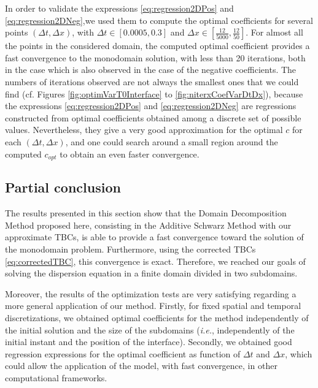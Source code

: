 \indent In order to validate the expressions \eqref{eq:regression2DPos} and \eqref{eq:regression2DNeg},we used them to compute the optimal coefficients for several points $(\Delta t, \Delta x)$, with $\Delta t \in [0.0005,0.3]$ and $\Delta x \in \left[ \frac{12}{5000},\frac{12}{50} \right]$. For almost all the points in the considered domain, the computed optimal coefficient provides a fast convergence to the monodomain solution, with less than 20 iterations, both in the case which is also observed in the case of the negative coefficients. The numbers of iterations observed are not always the smallest ones that we could find (cf. Figures \ref{fig:optimVarT0Interface} to \ref{fig:niterxCoefVarDtDx}), because the expressions \eqref{eq:regression2DPos} and \eqref{eq:regression2DNeg} are regressions constructed from optimal coefficients obtained among a discrete set of possible values. Nevertheless, they give a very good approximation for the optimal $c$ for each $(\Delta t, \Delta x)$, and one could search around a small region around the computed $c_{opt}$ to obtain an even faster convergence.




\subsection{Partial conclusion}
 
\indent The results presented in this section show that the Domain Decomposition Method proposed here, consisting in the Additive Schwarz Method with our approximate TBCs, is able to provide a fast convergence toward the solution of the monodomain problem. Furthermore, using the corrected TBCs \eqref{eq:correctedTBC}, this convergence is exact. Therefore, we reached our goals of solving the dispersion equation in a finite domain divided in two subdomains.

\indent Moreover, the results of the optimization tests are very satisfying regarding a more general application of our method. Firstly, for fixed spatial and temporal discretizations, we obtained optimal coefficients for the method independently of the initial solution and the size of the subdomains (\emph{i.e.}, independently of the initial instant and the position of the interface). Secondly, we obtained good regression expressions for the optimal coefficient as function of $\Delta t$ and $\Delta x$, which could allow the application of the model, with fast convergence, in other computational frameworks.













